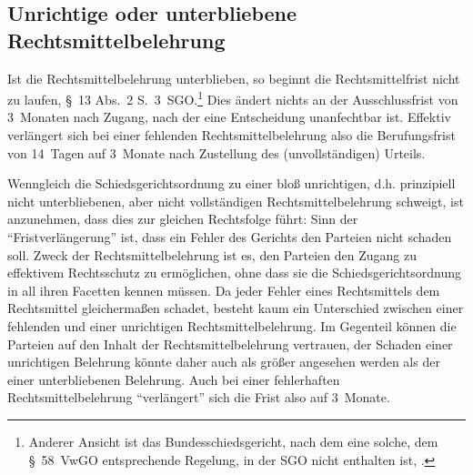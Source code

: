 \subsection{Unrichtige oder unterbliebene Rechtsmittelbelehrung}
Ist die Rechtsmittelbelehrung unterblieben, so beginnt die Rechtsmittelfrist nicht zu laufen, \S~13 Abs.~2 S.~3~SGO.\footnote{Anderer Ansicht ist das Bundesschiedsgericht, nach dem eine solche, dem §~58~VwGO entsprechende Regelung, in der SGO nicht enthalten ist, \cite{BSGPP100132493}.} Dies ändert nichts an der Ausschlussfrist von 3~Monaten nach Zugang, nach der eine Entscheidung unanfechtbar ist. Effektiv verlängert sich bei einer fehlenden Rechtsmittelbelehrung also die Berufungsfrist von 14~Tagen auf 3~Monate nach Zustellung des (unvollständigen) Urteils.

Wenngleich die Schiedsgerichtsordnung zu einer bloß unrichtigen, d.h. prinzipiell nicht unterbliebenen, aber nicht vollständigen Rechtsmittelbelehrung schweigt, ist anzunehmen, dass dies zur gleichen Rechtsfolge führt: Sinn der \enquote{Fristverlängerung} ist, dass ein Fehler des Gerichts den Parteien nicht schaden soll. Zweck der Rechtsmittelbelehrung ist es, den Parteien den Zugang zu effektivem Rechtsschutz zu ermöglichen, ohne dass sie die Schiedsgerichtsordnung in all ihren Facetten kennen müssen. Da jeder Fehler eines Rechtsmittels dem Rechtsmittel gleichermaßen schadet, besteht kaum ein Unterschied zwischen einer fehlenden und einer unrichtigen Rechtsmittelbelehrung. Im Gegenteil können die Parteien auf den Inhalt der Rechtsmittelbelehrung vertrauen, der Schaden einer unrichtigen Belehrung könnte daher auch als größer angesehen werden als der einer unterbliebenen Belehrung. Auch bei einer fehlerhaften Rechtsmittelbelehrung \enquote{verlängert} sich die Frist also auf 3~Monate.


